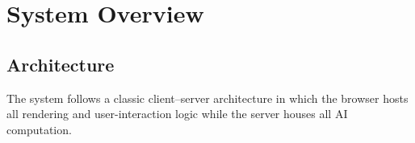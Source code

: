 \documentclass[12pt, a4paper]{report}
\begin{document}
\chapter{System Overview}
\label{chap:sysoverview}

\section{Architecture}
\label{sec:architecture}

The system follows a classic client--server architecture in which the browser
hosts all rendering and user-interaction logic while the server houses all AI
computation.
\end{document}

